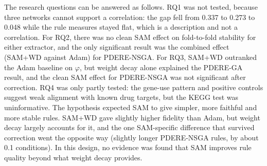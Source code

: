 The research questions can be answered as follows. RQ1 was not tested, because three networks cannot support a correlation: the gap fell from 0.337 to 0.273 to 0.048 while the rule measures stayed flat, which is a description and not a correlation. For RQ2, there was no clean SAM effect on fold-to-fold stability for either extractor, and the only significant result was the combined effect (SAM+WD against Adam) for PDERE-NSGA. For RQ3, SAM+WD outranked the Adam baseline on $\varphi$, but weight decay alone explained the PDERE-GA result, and the clean SAM effect for PDERE-NSGA was not significant after correction. RQ4 was only partly tested: the gene-use pattern and positive controls suggest weak alignment with known drug targets, but the KEGG test was uninformative. The hypothesis expected SAM to give simpler, more faithful and more stable rules. SAM+WD gave slightly higher fidelity than Adam, but weight decay largely accounts for it, and the one SAM-specific difference that survived correction went the opposite way (slightly longer PDERE-NSGA rules, by about 0.1 conditions). In this design, no evidence was found that SAM improves rule quality beyond what weight decay provides.